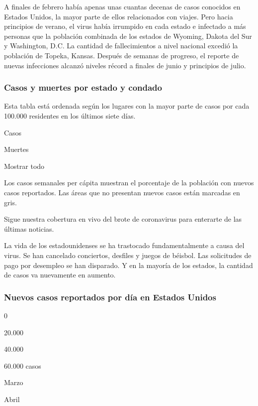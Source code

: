A finales de febrero había apenas unas cuantas decenas de casos
conocidos en Estados Unidos, la mayor parte de ellos relacionados con
viajes. Pero hacia principios de verano, el virus había irrumpido en
cada estado e infectado a más personas que la población combinada de los
estados de Wyoming, Dakota del Sur y Washington, D.C. La cantidad de
fallecimientos a nivel nacional excedió la población de Topeka, Kansas.
Después de semanas de progreso, el reporte de nuevas infecciones alcanzó
niveles récord a finales de junio y principios de julio.

\hypertarget{casos-y-muertes-por-estado-y-condado}{%
\subsubsection{Casos y muertes por estado y
condado}\label{casos-y-muertes-por-estado-y-condado}}

Esta tabla está ordenada según los lugares con la mayor parte de casos
por cada 100.000 residentes en los últimos siete días.

Casos

Muertes

Mostrar todo

Los casos semanales per cápita muestran el porcentaje de la población
con nuevos casos reportados. Las áreas que no presentan nuevos casos
están marcadas en gris.

Sigue nuestra cobertura en vivo del brote de coronavirus para enterarte
de las últimas noticias.

La vida de los estadounidenses se ha trastocado fundamentalmente a causa
del virus. Se han cancelado conciertos, desfiles y juegos de béisbol.
Las solicitudes de pago por desempleo se han disparado. Y en la mayoría
de los estados, la cantidad de casos va nuevamente en aumento.

\hypertarget{nuevos-casos-reportados-por-duxeda-en-estados-unidos}{%
\subsubsection{Nuevos casos reportados por día en Estados
Unidos}\label{nuevos-casos-reportados-por-duxeda-en-estados-unidos}}

0

20.000

40.000

60.000 casos

Marzo

Abril

